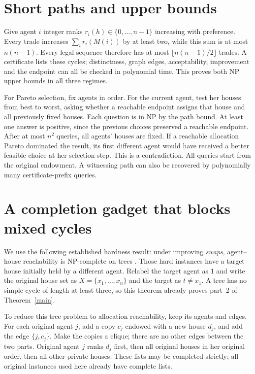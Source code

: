 \documentclass[11pt]{article}
\begin{document}
\section{Short paths and upper bounds}
Give agent $i$ integer ranks $r_i(h)\in\{0,\ldots,n-1\}$ increasing
with preference. Every trade increases $\sum_i r_i(M(i))$ by at least
two, while this sum is at most $n(n-1)$. Every legal sequence therefore
has at most $\lfloor n(n-1)/2\rfloor$ trades. A certificate lists these
cycles; distinctness, graph edges, acceptability, improvement and the
endpoint can all be checked in polynomial time. This proves both NP
upper bounds in all three regimes.

For Pareto selection, fix agents in order. For the current agent,
test her houses from best to worst, asking whether a reachable endpoint
assigns that house and all previously fixed houses. Each question is
in NP by the path bound. At least one answer is positive, since the
previous choices preserved a reachable endpoint. After at most $n^2$
queries, all agents' houses are fixed. If a reachable allocation Pareto
dominated the result, its first different agent would have received a
better feasible choice at her selection step. This is a contradiction.
All queries start from the original endowment. A witnessing path can
also be recovered by polynomially many certificate-prefix queries.

\section{A completion gadget that blocks mixed cycles}
We use the following established hardness result: under improving
\emph{swaps}, agent--house reachability is NP-complete on trees
\cite[Theorem 1]{swaps}. Those hard instances have a target house
initially held by a different agent. Relabel the target agent as $1$
and write the original house set as $X=\{x_1,\ldots,x_n\}$ and the target as
$t\ne x_1$. A tree has no simple cycle of length at least three,
so this theorem already proves part~2 of Theorem~\ref{main}.

To reduce this tree problem to allocation reachability, keep its agents
and edges. For each original agent $j$, add a copy $c_j$ endowed with a
new house $d_j$, and add the edge $\{j,c_j\}$. Make the copies a clique;
there are no other edges between the two parts. Original agent $j$
ranks $d_j$ first, then all original houses in her original order,
then all other private houses. These lists may be completed strictly;
all original instances used here already have complete lists.
\end{document}
